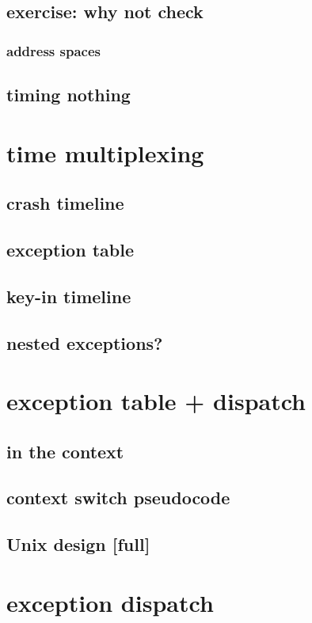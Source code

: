 
\subsection{exercise: why not check}


\subsubsection{address spaces}


\subsection{timing nothing}


\section{time multiplexing}


\subsection{crash timeline}


\subsection{exception table}


\subsection{key-in timeline}


\subsection{nested exceptions?}


\section{exception table + dispatch}


\subsection{in the context}


\subsection{context switch pseudocode}


\subsection{Unix design [full]}


\section{exception dispatch}



